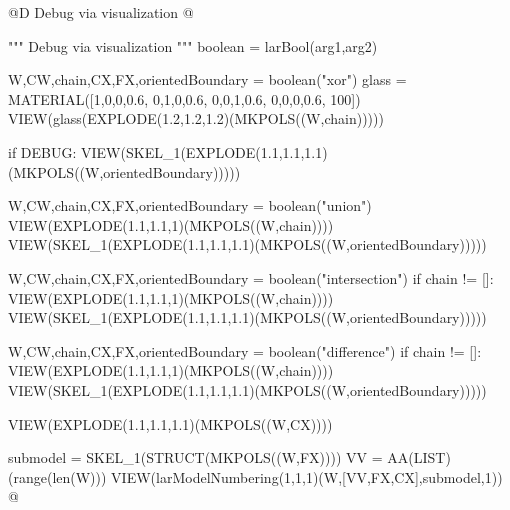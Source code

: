 \documentclass[11pt,oneside]{article}	%
\begin{document}
	
@D Debug via visualization
@{""" Debug via visualization """
boolean = larBool(arg1,arg2)	

W,CW,chain,CX,FX,orientedBoundary = boolean("xor")
glass = MATERIAL([1,0,0,0.6,  0,1,0,0.6,  0,0,1,0.6, 0,0,0,0.6, 100])
VIEW(glass(EXPLODE(1.2,1.2,1.2)(MKPOLS((W,chain)))))

if DEBUG:
    VIEW(SKEL_1(EXPLODE(1.1,1.1,1.1)(MKPOLS((W,orientedBoundary)))))
    
    W,CW,chain,CX,FX,orientedBoundary = boolean("union")
    VIEW(EXPLODE(1.1,1.1,1)(MKPOLS((W,chain))))
    VIEW(SKEL_1(EXPLODE(1.1,1.1,1.1)(MKPOLS((W,orientedBoundary)))))
    
    W,CW,chain,CX,FX,orientedBoundary = boolean("intersection")
    if chain != []:
    	VIEW(EXPLODE(1.1,1.1,1)(MKPOLS((W,chain))))
    	VIEW(SKEL_1(EXPLODE(1.1,1.1,1.1)(MKPOLS((W,orientedBoundary)))))
    
    W,CW,chain,CX,FX,orientedBoundary = boolean("difference")
    if chain != []:
    	VIEW(EXPLODE(1.1,1.1,1)(MKPOLS((W,chain))))
    	VIEW(SKEL_1(EXPLODE(1.1,1.1,1.1)(MKPOLS((W,orientedBoundary)))))
    
    	VIEW(EXPLODE(1.1,1.1,1.1)(MKPOLS((W,CX))))

submodel = SKEL_1(STRUCT(MKPOLS((W,FX))))
VV = AA(LIST)(range(len(W)))
VIEW(larModelNumbering(1,1,1)(W,[VV,FX,CX],submodel,1))
@}
\end{document}
